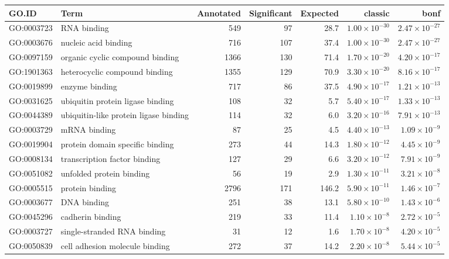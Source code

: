 \begin{table}[ht]
\centering
\begin{adjustbox}{max width=\textwidth}
\begin{tabular}{llrrrrr}
  \hline
GO.ID & Term & Annotated & Significant & Expected & classic & bonf \\ 
  \hline
GO:0003723 & RNA binding & 549 & 97 & 28.7 & $1.00 \times 10^{-30}$ & $2.47 \times 10^{-27}$ \\ 
  GO:0003676 & nucleic acid binding & 716 & 107 & 37.4 & $1.00 \times 10^{-30}$ & $2.47 \times 10^{-27}$ \\ 
  GO:0097159 & organic cyclic compound binding & 1366 & 130 & 71.4 & $1.70 \times 10^{-20}$ & $4.20 \times 10^{-17}$ \\ 
  GO:1901363 & heterocyclic compound binding & 1355 & 129 & 70.9 & $3.30 \times 10^{-20}$ & $8.16 \times 10^{-17}$ \\ 
  GO:0019899 & enzyme binding & 717 & 86 & 37.5 & $4.90 \times 10^{-17}$ & $1.21 \times 10^{-13}$ \\ 
  GO:0031625 & ubiquitin protein ligase binding & 108 & 32 & 5.7 & $5.40 \times 10^{-17}$ & $1.33 \times 10^{-13}$ \\ 
  GO:0044389 & ubiquitin-like protein ligase binding & 114 & 32 & 6.0 & $3.20 \times 10^{-16}$ & $7.91 \times 10^{-13}$ \\ 
  GO:0003729 & mRNA binding & 87 & 25 & 4.5 & $4.40 \times 10^{-13}$ & $1.09 \times 10^{-9}$ \\ 
  GO:0019904 & protein domain specific binding & 273 & 44 & 14.3 & $1.80 \times 10^{-12}$ & $4.45 \times 10^{-9}$ \\ 
  GO:0008134 & transcription factor binding & 127 & 29 & 6.6 & $3.20 \times 10^{-12}$ & $7.91 \times 10^{-9}$ \\ 
  GO:0051082 & unfolded protein binding & 56 & 19 & 2.9 & $1.30 \times 10^{-11}$ & $3.21 \times 10^{-8}$ \\ 
  GO:0005515 & protein binding & 2796 & 171 & 146.2 & $5.90 \times 10^{-11}$ & $1.46 \times 10^{-7}$ \\ 
  GO:0003677 & DNA binding & 251 & 38 & 13.1 & $5.80 \times 10^{-10}$ & $1.43 \times 10^{-6}$ \\ 
  GO:0045296 & cadherin binding & 219 & 33 & 11.4 & $1.10 \times 10^{-8}$ & $2.72 \times 10^{-5}$ \\ 
  GO:0003727 & single-stranded RNA binding & 31 & 12 & 1.6 & $1.70 \times 10^{-8}$ & $4.20 \times 10^{-5}$ \\ 
  GO:0050839 & cell adhesion molecule binding & 272 & 37 & 14.2 & $2.20 \times 10^{-8}$ & $5.44 \times 10^{-5}$ \\ 

\end{tabular}
\end{adjustbox}
\end{table}
